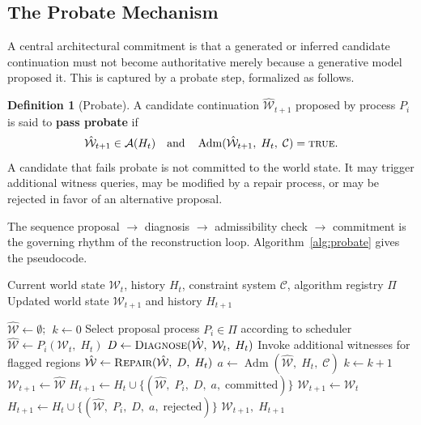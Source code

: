 \documentclass[11pt,a4paper]{article}
\theoremstyle{plain}
\theoremstyle{definition}
\newtheorem{definition}[theorem]{Definition}
\theoremstyle{remark}
\DeclareMathOperator{\Adm}{Adm}
\begin{document}
\subsection{The Probate Mechanism}

A central architectural commitment is that a generated or inferred candidate continuation must not become authoritative merely because a generative model proposed it. This is captured by a probate step, formalized as follows.

\begin{definition}[Probate]
A candidate continuation $\hat{\mathcal{W}}_{t+1}$ proposed by process $P_i$ is said to \textbf{pass probate} if
\[
\hat{\mathcal{W}}_{t+1} \in \mathcal{A}(H_t) \quad \text{and} \quad \Adm(\hat{\mathcal{W}}_{t+1},\; H_t,\; \mathcal{C}) = \textsc{true}.
\]
A candidate that fails probate is not committed to the world state. It may trigger additional witness queries, may be modified by a repair process, or may be rejected in favor of an alternative proposal.
\end{definition}

The sequence proposal $\to$ diagnosis $\to$ admissibility check $\to$ commitment is the governing rhythm of the reconstruction loop. Algorithm~\ref{alg:probate} gives the pseudocode.

\begin{algorithm}[h]
\caption{Probate Loop for World State Continuation}
\label{alg:probate}
\begin{algorithmic}[1]
\Require Current world state $\mathcal{W}_t$, history $H_t$, constraint system $\mathcal{C}$, algorithm registry $\Pi$
\Ensure Updated world state $\mathcal{W}_{t+1}$ and history $H_{t+1}$

\State $\hat{\mathcal{W}} \gets \emptyset$; $\;k \gets 0$
    \State Select proposal process $P_i \in \Pi$ according to scheduler
    \State $\hat{\mathcal{W}} \gets P_i(\mathcal{W}_t,\; H_t)$ 
    \State $D \gets \textsc{Diagnose}(\hat{\mathcal{W}},\; \mathcal{W}_t,\; H_t)$ 
        \State Invoke additional witnesses for flagged regions 
        \State $\hat{\mathcal{W}} \gets \textsc{Repair}(\hat{\mathcal{W}},\; D,\; H_t)$ 
    \EndIf
    \State $a \gets \Adm(\hat{\mathcal{W}},\; H_t,\; \mathcal{C})$ 
    \State $k \gets k + 1$
\EndWhile
{}
    \State $\mathcal{W}_{t+1} \gets \hat{\mathcal{W}}$
    \State $H_{t+1} \gets H_t \cup \{(\hat{\mathcal{W}},\; P_i,\; D,\; a,\; \text{committed})\}$ 
\Else
    \State $\mathcal{W}_{t+1} \gets \mathcal{W}_t$ 
    \State $H_{t+1} \gets H_t \cup \{(\hat{\mathcal{W}},\; P_i,\; D,\; a,\; \text{rejected})\}$
\EndIf
\State \Return $\mathcal{W}_{t+1},\; H_{t+1}$
\end{algorithmic}
\end{algorithm}
\end{document}
